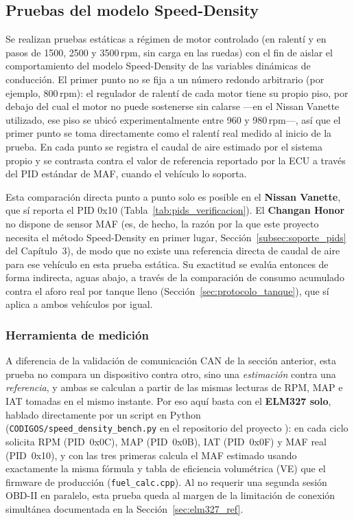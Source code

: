 \subsection{Pruebas del modelo Speed-Density}

Se realizan pruebas estáticas a régimen de motor controlado (en ralentí y en pasos de 1500, 2500 y 3500\,rpm, sin carga en las ruedas) con el fin de aislar el comportamiento del modelo Speed-Density de las variables dinámicas de conducción. El primer punto no se fija a un número redondo arbitrario (por ejemplo, 800\,rpm): el regulador de ralentí de cada motor tiene su propio piso, por debajo del cual el motor no puede sostenerse sin calarse —en el Nissan Vanette utilizado, ese piso se ubicó experimentalmente entre 960 y 980\,rpm—, así que el primer punto se toma directamente como el ralentí real medido al inicio de la prueba. En cada punto se registra el caudal de aire estimado por el sistema propio y se contrasta contra el valor de referencia reportado por la ECU a través del PID estándar de MAF, cuando el vehículo lo soporta.

Esta comparación directa punto a punto solo es posible en el \textbf{Nissan Vanette}, que sí reporta el PID 0x10 (Tabla~\ref{tab:pids_verificacion}). El \textbf{Changan Honor} no dispone de sensor MAF (es, de hecho, la razón por la que este proyecto necesita el método Speed-Density en primer lugar, Sección~\ref{subsec:soporte_pids} del Capítulo~3), de modo que no existe una referencia directa de caudal de aire para ese vehículo en esta prueba estática. Su exactitud se evalúa entonces de forma indirecta, aguas abajo, a través de la comparación de consumo acumulado contra el aforo real por tanque lleno (Sección~\ref{sec:protocolo_tanque}), que sí aplica a ambos vehículos por igual.

\subsubsection*{Herramienta de medición}

A diferencia de la validación de comunicación CAN de la sección anterior, esta prueba no compara un dispositivo contra otro, sino una \emph{estimación} contra una \emph{referencia}, y ambas se calculan a partir de las mismas lecturas de RPM, MAP e IAT tomadas en el mismo instante. Por eso aquí basta con el \textbf{ELM327 solo}, hablado directamente por un script en Python (\texttt{CODIGOS/speed\_density\_bench.py} en el repositorio del proyecto \citep{CalleGitHub2026}): en cada ciclo solicita RPM (PID~0x0C), MAP (PID~0x0B), IAT (PID~0x0F) y MAF real (PID~0x10), y con las tres primeras calcula el MAF estimado usando exactamente la misma fórmula y tabla de eficiencia volumétrica (VE) que el firmware de producción (\texttt{fuel\_calc.cpp}). Al no requerir una segunda sesión OBD-II en paralelo, esta prueba queda al margen de la limitación de conexión simultánea documentada en la Sección~\ref{sec:elm327_ref}.

